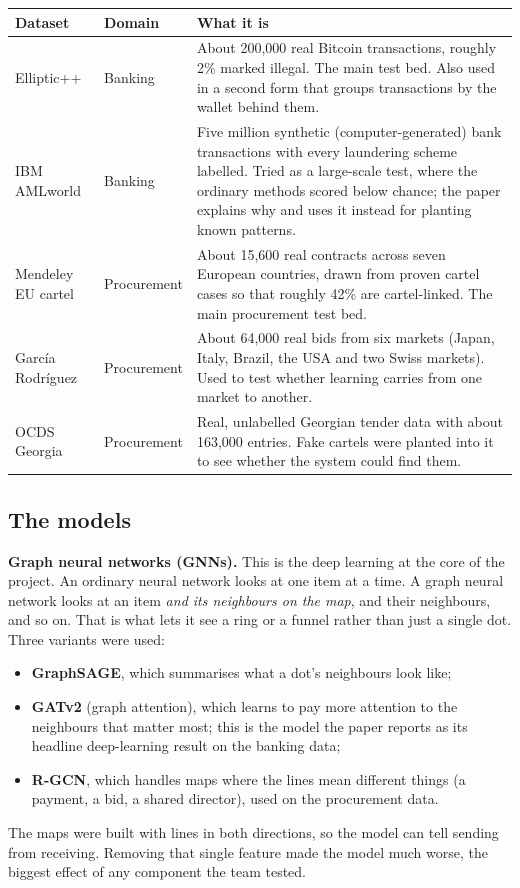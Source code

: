 \documentclass[11pt,a4paper]{article}
\begin{document}
\begin{center}
\small
\begin{tabular}{p{3.6cm}p{2.3cm}p{8.2cm}}
\toprule
\textbf{Dataset} & \textbf{Domain} & \textbf{What it is} \\
\midrule
Elliptic++ & Banking & About 200,000 real Bitcoin transactions, roughly 2\% marked illegal. The main test bed. Also used in a second form that groups transactions by the wallet behind them. \\
IBM AMLworld & Banking & Five million synthetic (computer-generated) bank transactions with every laundering scheme labelled. Tried as a large-scale test, where the ordinary methods scored below chance; the paper explains why and uses it instead for planting known patterns. \\
Mendeley EU cartel & Procurement & About 15,600 real contracts across seven European countries, drawn from proven cartel cases so that roughly 42\% are cartel-linked. The main procurement test bed. \\
Garc\'ia Rodr\'iguez & Procurement & About 64,000 real bids from six markets (Japan, Italy, Brazil, the USA and two Swiss markets). Used to test whether learning carries from one market to another. \\
OCDS Georgia & Procurement & Real, unlabelled Georgian tender data with about 163,000 entries. Fake cartels were planted into it to see whether the system could find them. \\
\bottomrule
\end{tabular}
\end{center}

\subsection{The models}

\textbf{Graph neural networks (GNNs).} This is the deep learning at the core of
the project. An ordinary neural network looks at one item at a time. A graph
neural network looks at an item \emph{and its neighbours on the map}, and their
neighbours, and so on. That is what lets it see a ring or a funnel rather than
just a single dot. Three variants were used:
\begin{itemize}
\item \textbf{GraphSAGE}, which summarises what a dot's neighbours look like;
\item \textbf{GATv2} (graph attention), which learns to pay more attention to
      the neighbours that matter most; this is the model the paper reports as
      its headline deep-learning result on the banking data;
\item \textbf{R-GCN}, which handles maps where the lines mean different things
      (a payment, a bid, a shared director), used on the procurement data.
\end{itemize}
The maps were built with lines in both directions, so the model can tell
sending from receiving. Removing that single feature made the model much worse,
the biggest effect of any component the team tested.
\end{document}
